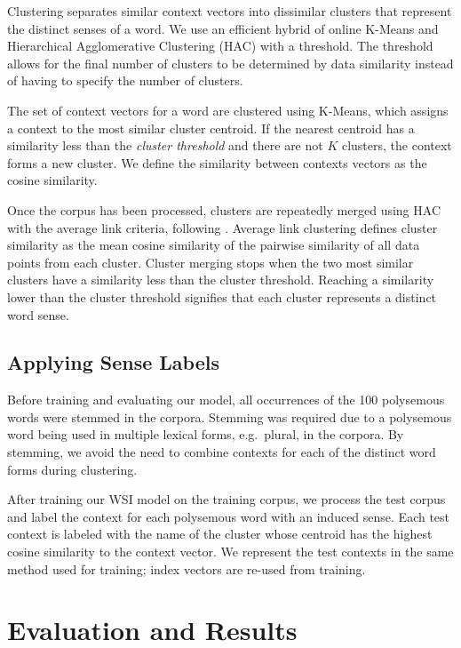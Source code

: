 \documentclass[11pt,a4]{article}
\begin{document}
Clustering separates similar context vectors into dissimilar clusters that
represent the distinct senses of a word.  We use an efficient hybrid of online
K-Means and Hierarchical Agglomerative Clustering (HAC) with a threshold.  The
threshold allows for the final number of clusters to be determined by data
similarity instead of having to specify the number of clusters.

The set of context vectors for a word are clustered using K-Means, which
assigns a context to the most similar cluster centroid.  If the nearest centroid
has a similarity less than the \emph{cluster threshold} and there are not $K$
clusters, the context forms a new cluster.  We define the similarity between
contexts vectors as the cosine similarity.

Once the corpus has been processed, clusters are repeatedly merged using HAC
with the average link criteria, following \cite{pedersen97distinguishing}.
Average link clustering defines cluster similarity as the mean cosine similarity
of the pairwise similarity of all data points from each cluster.  Cluster
merging stops when the two most similar clusters have a similarity less than the
cluster threshold.  Reaching a similarity lower than the cluster threshold
signifies that each cluster represents a distinct word sense.  

\subsection{Applying Sense Labels}

Before training and evaluating our model, all occurrences of the 100 polysemous
words were stemmed in the corpora.  Stemming was required due to a polysemous
word being used in multiple lexical forms, e.g.\ plural, in the corpora.  By
stemming, we avoid the need to combine contexts for each of the distinct word
forms during clustering.

After training our WSI model on the training corpus, we process the test corpus
and label the context for each polysemous word with an induced sense.  
%
Each test context is labeled with the name of the cluster whose centroid has the
highest cosine similarity to the context vector.
%
We represent the test contexts in the same method used for training; index
vectors are re-used from training.


\section{Evaluation and Results}
\end{document}
